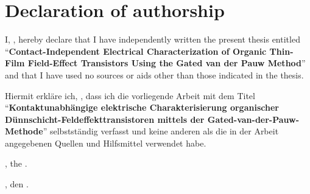 \chapter*{Declaration of authorship}
\thispagestyle{plain}

\noindent I, \getAuthor, hereby declare that I have independently written the present thesis entitled \enquote{\textbf{Contact-Independent Electrical Characterization of Organic Thin-Film Field-Effect Transistors Using the Gated van der Pauw Method}} and that I have used no sources or aids other than those indicated in the thesis.

\vspace*{0.5cm}

\noindent Hiermit erkläre ich, \getAuthor, dass ich die vorliegende Arbeit mit dem Titel
\enquote{\textbf{Kontaktunabhängige elektrische Charakterisierung organischer Dünnschicht-Feldeffekttransistoren mittels der Gated-van-der-Pauw-Methode}}
selbstständig verfasst und keine anderen als die in der Arbeit angegebenen Quellen und Hilfsmittel verwendet habe.

\vspace*{1cm}

\noindent \getPrintLocationEN, the \getSubmissionDateEN.

\noindent \getPrintLocationDE, den \getSubmissionDateDE.

\vspace*{2cm}
\par\noindent\makebox[2.5in]{\hspace*{-1pt}\hrulefill}
\par\noindent\makebox[2.5in][l]{\getAuthor}
